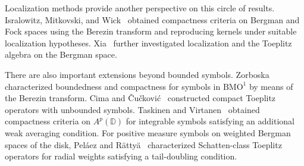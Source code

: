 \documentclass[12pt,a4paper]{article}
\theoremstyle{remark}
\newcommand{\D}{\mathbb D}
\begin{document}
Localization methods provide another perspective on this circle of results. Isralowitz, Mitkovski, and Wick~\cite{IMW2015} obtained compactness criteria on Bergman and Fock spaces using the Berezin transform and reproducing kernels under suitable localization hypotheses. Xia~\cite{Xia2015} further investigated localization and the Toeplitz algebra on the Bergman space. 


There are also important extensions beyond bounded symbols. Zorboska~\cite{Zorboska2003} characterized boundedness and compactness for symbols in $\mathrm{BMO}^1$ by means of the Berezin transform. Cima and \v{C}u\v{c}kovi\'c~\cite{CC2005} constructed compact Toeplitz operators with unbounded symbols. Taskinen and Virtanen~\cite{TV2018} obtained compactness criteria on $A^p(\D)$ for integrable symbols satisfying an additional weak averaging condition.  For positive measure symbols on weighted Bergman spaces of the disk, Pel\'aez and R\"atty\"a~\cite{PR2016} characterized Schatten-class Toeplitz operators for radial weights satisfying a tail-doubling condition. 
\end{document}
